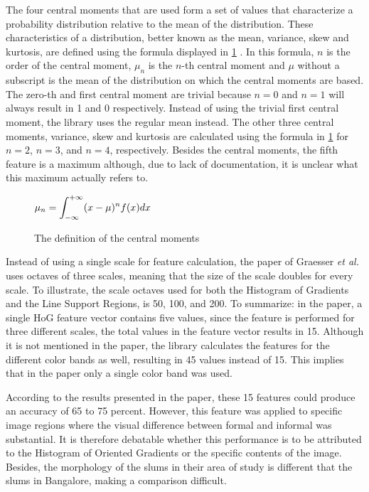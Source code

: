 The four central moments that are used form a set of values that characterize a probability distribution relative to the mean of the distribution. These characteristics of a distribution, better known as the mean, variance, skew and kurtosis, are defined using the formula displayed in \ref{central_moments} \cite{grimmett2001probability}. In this formula, $n$ is the order of the central moment, $\mu_{n}$ is the $n$-th central moment and $\mu$ without a subscript is the mean of the distribution on which the central moments are based. The zero-th and first central moment are trivial because $n=0$ and $n=1$ will always result in 1 and 0 respectively. Instead of using the trivial first central moment, the library uses the regular mean instead. The other three central moments, variance, skew and kurtosis are calculated using the formula in \ref{central_moments} for $n=2$, $n=3$, and $n=4$, respectively. Besides the central moments, the fifth feature is a maximum although, due to lack of documentation, it is unclear what this maximum actually refers to.

\begin{figure}[h]
	\centering
	$\mathlarger{\mu_{n} = \int_{-\infty}^{+\infty} (x-\mu)^nf(x)dx} $
	\caption{The definition of the central moments}
	\label{central_moments}
\end{figure}

Instead of using a single scale for feature calculation, the paper of Graesser \textit{et al.} uses octaves of three scales, meaning that the size of the scale doubles for every scale. To illustrate, the scale octaves used for both the Histogram of Gradients and the Line Support Regions, is 50, 100, and 200. To summarize: in the paper, a single HoG feature vector contains five values, since the feature is performed for three different scales, the total values in the feature vector results in 15. Although it is not mentioned in the paper, the library calculates the features for the different color bands as well, resulting in 45 values instead of 15. This implies that in the paper only a single color band was used.

According to the results presented in the paper, these 15 features could produce an accuracy of 65 to 75 percent. However, this feature was applied to specific image regions where the visual difference between formal and informal was substantial. It is therefore debatable whether this performance is to be attributed to the Histogram of Oriented Gradients or the specific contents of the image. Besides, the morphology of the slums in their area of study is different that the slums in Bangalore, making a comparison difficult.


